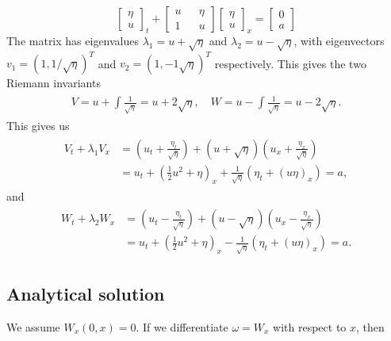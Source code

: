 \documentclass[11pt]{article}
\begin{document}
\begin{equation*}
\begin{bmatrix}
	\eta \\
	u
\end{bmatrix}_t
+
\begin{bmatrix}
u	&& 	\eta \\
1 	&&	u
\end{bmatrix}
\begin{bmatrix}
\eta\\
u
\end{bmatrix}_x
= 
\begin{bmatrix}
0\\
a
\end{bmatrix}
\end{equation*}
The matrix has eigenvalues $\lambda_1 = u + \sqrt{\eta}$ and $\lambda_2 = u - \sqrt{\eta}$, with eigenvectors $v_1 = (1,1/\sqrt{\eta})^T$ and $v_2 = (1, {-}1\sqrt{\eta})^T$ respectively. This gives the two Riemann invariants
\begin{align*}
	\begin{aligned}
		V = u + \int \frac{1}{\sqrt{\eta}} = u + 2\sqrt{\eta},\quad
		W = u - \int \frac{1}{\sqrt{\eta}} = u - 2\sqrt{\eta}.
	\end{aligned}
\end{align*}
This gives us
\begin{align}
\begin{aligned}
	\label{eq:shallowWaterRiemannV}
	V_t + \lambda_1V_x &= \left(u_t + \frac{\eta_t}{\sqrt{\eta}}\right) + (u + \sqrt{\eta})\left(u_x + \frac{\eta_x}{\sqrt \eta}\right)\\
	& = u_t + \left(\frac{1}{2}u^2 + \eta\right)_x + \frac{1}{\sqrt \eta}(\eta_t + (u\eta)_x) = a,
\end{aligned}
\end{align}
and
\begin{align}
	\label{eq:shallowWaterRiemannW}
	\begin{aligned}
		W_t + \lambda_2W_x &= \left(u_t - \frac{\eta_t}{\sqrt{\eta}}\right) + (u - \sqrt{\eta})\left(u_x - \frac{\eta_x}{\sqrt \eta}\right)\\
		& = u_t + \left(\frac{1}{2}u^2 + \eta\right)_x - \frac{1}{\sqrt \eta}(\eta_t + (u\eta)_x) = a.
	\end{aligned}
\end{align}
\subsection{Analytical solution}
We assume $W_x(0,x) = 0$. If we differentiate $\omega = W_x$ with respect to $x$, then
\end{document}
